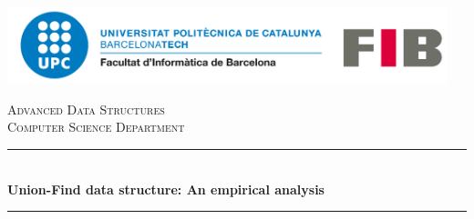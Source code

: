 \begin{titlepage}

\newcommand{\HRule}{\rule{\linewidth}{0.5mm}} %

\begin{center}
\includegraphics[width=12.75cm]{title/logo-upc.png}\\[1cm] %
\end{center}
 

\center %





\textsc{\LARGE Advanced Data Structures}\\[1.0cm] %
\textsc{\large Computer Science Department}\\[0.5cm] %

\makeatletter
\HRule \\[0.4cm]
{ \huge \bfseries Union-Find data structure: An empirical analysis}\\[0.4cm] %
\HRule \\[1.5cm]
 \vspace{0.25cm}


\end{titlepage}
